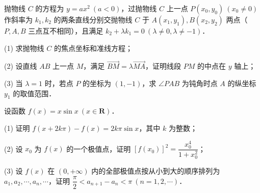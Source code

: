 \begin{question}
抛物线 $C$ 的方程为 $y = ax^2\ (a < 0)$，过抛物线 $C$ 上一点 $P(x_0, y_0)\ (x_0 \neq 0)$ 作斜率为 $k_1, k_2$ 的两条直线分别交抛物线 $C$ 于 $A(x_1, y_1), B(x_2, y_2)$ 两点（$P, A, B$ 三点互不相同），且满足 $k_2 + \lambda k_1 = 0\ (\lambda \neq 0, \lambda \neq -1)$．

(1) 求抛物线 $C$ 的焦点坐标和准线方程；

(2) 设直线 $AB$ 上一点 $M$，满足 $\vec{BM} = \lambda \vec{MA}$，证明线段 $PM$ 的中点在 $y$ 轴上；

(3) 当 $\lambda = 1$ 时，若点 $P$ 的坐标为 $(1, -1)$，求 $\angle PAB$ 为钝角时点 $A$ 的纵坐标 $y_1$ 的取值范围．

\end{question}
\begin{question}
设函数 $f(x) = x \sin x\ (x \in \mathbf{R})$．

(1) 证明 $f(x + 2k\pi) - f(x) = 2k\pi \sin x$，其中 $k$ 为整数；

(2) 设 $x_0$ 为 $f(x)$ 的一个极值点，证明 $[f(x_0)]^2 = \dfrac{x_0^4}{1 + x_0^2}$；

(3) 设 $f(x)$ 在 $(0, +\infty)$ 内的全部极值点按从小到大的顺序排列为 $a_1, a_2, \cdots, a_n, \cdots$，证明 $\dfrac{\pi}{2} < a_{n+1} - a_n < \pi\ (n = 1, 2, \cdots)$．

\end{question}